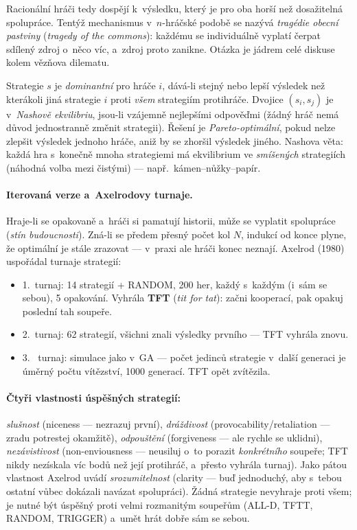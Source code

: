 \documentclass[11pt,a4paper]{article}
\theoremstyle{definition}
\begin{document}
Racionální hráči tedy dospějí k~výsledku, který je pro oba horší než dosažitelná
spolupráce. Tentýž mechanismus v~$n$-hráčské podobě se nazývá \emph{tragédie
obecní pastviny} (\emph{tragedy of the commons}): každému se individuálně
vyplatí čerpat sdílený zdroj o~něco víc, a~zdroj proto zanikne. Otázka
 je jádrem celé
diskuse kolem vězňova dilematu.

\begin{defbox}
Strategie $s$ je \emph{dominantní} pro hráče $i$, dává-li stejný nebo lepší
výsledek než kterákoli jiná strategie $i$ proti \emph{všem} strategiím
protihráče. Dvojice $(s_i, s_j)$ je v~\emph{Nashově ekvilibriu}, jsou-li
vzájemně nejlepšími odpověďmi (žádný hráč nemá důvod jednostranně změnit
strategii). Řešení je \emph{Pareto-optimální}, pokud nelze zlepšit výsledek
jednoho hráče, aniž by se zhoršil výsledek jiného.
Nashova věta: každá hra s~konečně mnoha strategiemi má ekvilibrium
ve \emph{smíšených} strategiích (náhodná volba mezi čistými) ---
např.\ kámen--nůžky--papír.
\end{defbox}

\paragraph{Iterovaná verze a~Axelrodovy turnaje.} Hraje-li se opakovaně
a~hráči si pamatují historii, může se vyplatit spolupráce (\emph{stín
budoucnosti}). Zná-li se předem přesný počet kol $N$, indukcí od konce plyne,
že optimální je stále zrazovat --- v~praxi ale hráči konec neznají.
Axelrod (1980) uspořádal turnaje strategií:
\begin{itemize}
\item 1.\ turnaj: 14 strategií + RANDOM, 200 her, každý s~každým (i~sám se
  sebou), 5 opakování. Vyhrála \textbf{TFT} (\emph{tit for tat}): začni
  kooperací, pak opakuj poslední tah soupeře.
\item 2.\ turnaj: 62 strategií, všichni znali výsledky prvního --- TFT
  vyhrála znovu.
\item 3.\  turnaj: simulace jako v~GA --- počet jedinců
  strategie v~další generaci je úměrný počtu vítězství, 1000 generací.
  TFT opět zvítězila.
\end{itemize}

\paragraph{Čtyři vlastnosti úspěšných strategií:}
\emph{slušnost} (niceness --- nezrazuj první),
\emph{dráždivost} (provocability/retaliation --- zradu potrestej okamžitě),
\emph{odpouštění} (forgiveness --- ale rychle se uklidni),
\emph{nezávistivost} (non-enviousness --- neusiluj o~to porazit \emph{konkrétního}
soupeře; TFT nikdy nezískala víc bodů než její protihráč, a~přesto vyhrála turnaj).
Jako pátou vlastnost Axelrod uvádí \emph{srozumitelnost} (clarity --- buď jednoduchý,
aby s~tebou ostatní vůbec dokázali navázat spolupráci).
Žádná strategie nevyhraje proti všem; je nutné být úspěšný proti velmi
rozmanitým soupeřům (ALL-D, TFTT, RANDOM, TRIGGER) a~umět hrát dobře sám
se sebou.
\end{document}
